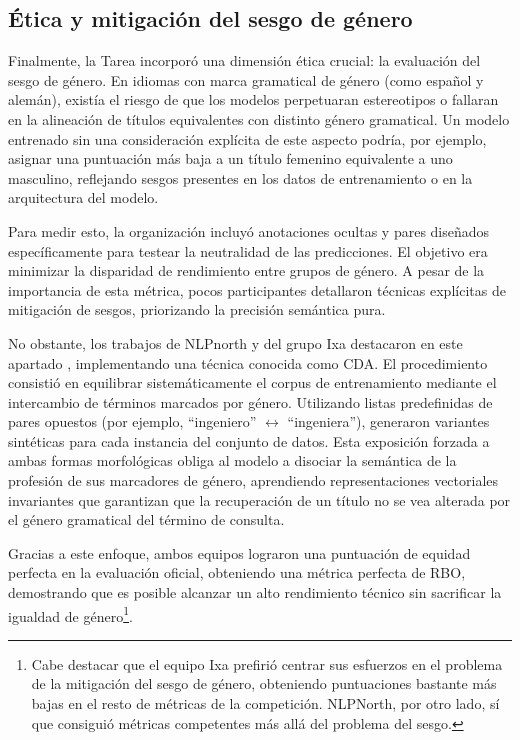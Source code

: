 \subsection{Ética y mitigación del sesgo de género}

\noindent Finalmente, la \gls{Tarea} incorporó una dimensión ética crucial: la evaluación del sesgo de género. En idiomas con marca gramatical de género (como español y alemán), existía el riesgo de que los modelos perpetuaran estereotipos o fallaran en la alineación de títulos equivalentes con distinto género gramatical. Un modelo entrenado sin una consideración explícita de este aspecto podría, por ejemplo, asignar una puntuación más baja a un título femenino equivalente a uno masculino, reflejando sesgos presentes en los datos de entrenamiento o en la arquitectura del modelo.

Para medir esto, la organización incluyó anotaciones ocultas y pares diseñados específicamente para testear la neutralidad de las predicciones. El objetivo era minimizar la disparidad de rendimiento entre grupos de género. A pesar de la importancia de esta métrica, pocos participantes detallaron técnicas explícitas de mitigación de sesgos, priorizando la precisión semántica pura. 

No obstante, los trabajos de NLPnorth y del grupo Ixa destacaron en este apartado \cite{zhang2025nlpnorth,villar2025hulat}, implementando una técnica conocida como \gls{CDA}. El procedimiento consistió en equilibrar sistemáticamente el corpus de entrenamiento mediante el intercambio de términos marcados por género. Utilizando listas predefinidas de pares opuestos (por ejemplo, ``ingeniero'' $\leftrightarrow$ ``ingeniera''), generaron variantes sintéticas para cada instancia del conjunto de datos. Esta exposición forzada a ambas formas morfológicas obliga al modelo a disociar la semántica de la profesión de sus marcadores de género, aprendiendo representaciones vectoriales invariantes que garantizan que la recuperación de un título no se vea alterada por el género gramatical del término de consulta.

Gracias a este enfoque, ambos equipos lograron una puntuación de equidad perfecta en la evaluación oficial, obteniendo una métrica perfecta de \gls{RBO}, demostrando que es posible alcanzar un alto rendimiento técnico sin sacrificar la igualdad de género\footnote{Cabe destacar que el equipo Ixa prefirió centrar sus esfuerzos en el problema de la mitigación del sesgo de género, obteniendo puntuaciones bastante más bajas en el resto de métricas de la competición. NLPNorth, por otro lado, sí que consiguió métricas competentes más allá del problema del sesgo.}.

